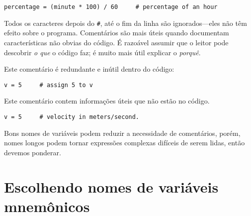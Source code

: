 {{{{{{{{{{{{{{{{{\beforeverb
\begin{verbatim}
percentage = (minute * 100) / 60     # percentage of an hour
\end{verbatim}
\afterverb
%

Todos os caracteres depois do {\tt \#}, até o fim da linha são ignorados---eles 
não têm efeito sobre o programa.
%
Comentários são mais úteis quando documentam características não obvias 
do código. É razoável assumir que o leitor pode descobrir 
\emph{o que} o código faz; é muito mais útil explicar o \emph{porquê}.  

Este comentário é redundante e inútil dentro do código:

\beforeverb
\begin{verbatim}
v = 5     # assign 5 to v
\end{verbatim}
\afterverb

Este comentário contem informações úteis que não estão no código.

\beforeverb
\begin{verbatim}
v = 5     # velocity in meters/second. 
\end{verbatim}
\afterverb

Bons nomes de variáveis podem reduzir a necessidade de comentários, porém, 
nomes longos podem tornar expressões complexas difíceis de serem lidas, então devemos
ponderar. 
 
\section{Escolhendo nomes de variáveis mnemônicos}


}}}}}}}}}}}}}}}}}

